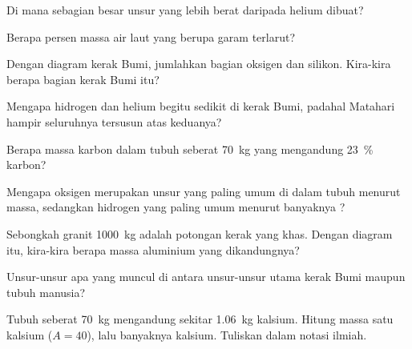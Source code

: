 \begin{exercise}[$\star$]\label{exo:g9:elements-universe-earth:3}
Di mana sebagian besar unsur yang lebih berat daripada helium dibuat?
\end{exercise}

\begin{exercise}[$\star$]\label{exo:g9:elements-universe-earth:4}
Berapa persen massa air laut yang berupa garam terlarut?
\end{exercise}

\begin{exercise}[$\star\star$]\label{exo:g9:elements-universe-earth:5}
Dengan diagram kerak Bumi, jumlahkan bagian oksigen dan silikon.
Kira-kira berapa bagian kerak Bumi itu?
\end{exercise}

\begin{exercise}[$\star\star$]\label{exo:g9:elements-universe-earth:6}
Mengapa hidrogen dan helium begitu sedikit di kerak Bumi, padahal
Matahari hampir seluruhnya tersusun atas keduanya?
\end{exercise}

\begin{exercise}[$\star\star$]\label{exo:g9:elements-universe-earth:7}
Berapa massa karbon dalam tubuh seberat \qty{70}{kg} yang mengandung
\qty{23}{\percent} karbon?
\end{exercise}

\begin{exercise}[$\star\star$]\label{exo:g9:elements-universe-earth:8}
Mengapa oksigen merupakan unsur yang paling umum di dalam tubuh menurut
massa, sedangkan hidrogen yang paling umum menurut banyaknya ?
\end{exercise}

\begin{exercise}[$\star\star$]\label{exo:g9:elements-universe-earth:9}
Sebongkah granit \qty{1000}{kg} adalah potongan kerak yang khas. Dengan
diagram itu, kira-kira berapa massa aluminium yang dikandungnya?
\end{exercise}

\begin{exercise}[$\star\star$]\label{exo:g9:elements-universe-earth:10}
Unsur-unsur apa yang muncul di antara unsur-unsur utama kerak Bumi
maupun tubuh manusia?
\end{exercise}

\begin{exercise}[$\star\star\star$]\label{exo:g9:elements-universe-earth:11}
Tubuh seberat \qty{70}{kg} mengandung sekitar \qty{1.06}{kg} kalsium.
Hitung massa satu  kalsium ($A = 40$), lalu banyaknya  kalsium.
Tuliskan dalam notasi ilmiah.
\end{exercise}

